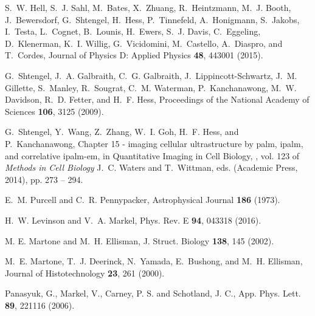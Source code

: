 \documentclass[prl,twocolumn]{revtex4-1}
\begin{document}
\begin{thebibliography}{10}
S.~W. Hell, S.~J. Sahl, M.~Bates, X.~Zhuang, R.~Heintzmann, M.~J. Booth,
  J.~Bewersdorf, G.~Shtengel, H.~Hess, P.~Tinnefeld, A.~Honigmann, S.~Jakobs,
  I.~Testa, L.~Cognet, B.~Lounis, H.~Ewers, S.~J. Davis, C.~Eggeling,
  D.~Klenerman, K.~I. Willig, G.~Vicidomini, M.~Castello, A.~Diaspro, and
  T.~Cordes, Journal of Physics D: Applied Physics \textbf{48}, 443001 (2015).

G.~Shtengel, J.~A. Galbraith, C.~G. Galbraith, J.~Lippincott-Schwartz, J.~M.
  Gillette, S.~Manley, R.~Sougrat, C.~M. Waterman, P.~Kanchanawong, M.~W.
  Davidson, R.~D. Fetter, and H.~F. Hess, Proceedings of the National Academy
  of Sciences \textbf{106}, 3125 (2009).

G.~Shtengel, Y.~Wang, Z.~Zhang, W.~I. Goh, H.~F. Hess, and P.~Kanchanawong,
{Chapter 15 - imaging cellular ultrastructure by palm, ipalm, and
  correlative ipalm-em,} in {Quantitative Imaging in Cell Biology,} ,
  vol. 123 of \emph{Methods in Cell Biology} J.~C. Waters and T.~Wittman, eds.
  (Academic Press, 2014), pp. 273 -- 294.

E.~M. Purcell and C.~R. Pennypacker, Astrophysical Journal \textbf{186} (1973).

H.~W. Levinson and V.~A. Markel, Phys. Rev. E \textbf{94}, 043318 (2016).

M. E. Martone and M.~H. Ellisman, J. Struct.
Biology \textbf{138}, 145 (2002).

M.~E. Martone, T.~J. Deerinck, N.~Yamada, E.~Bushong, and M.~H. Ellisman,
Journal of Histotechnology \textbf{23}, 261 (2000).

Panasyuk, G., Markel, V., Carney, P. S. and Schotland, J. C., App. Phys. Lett. {\bf 89}, 221116 (2006).

\end{thebibliography}
\end{document}
